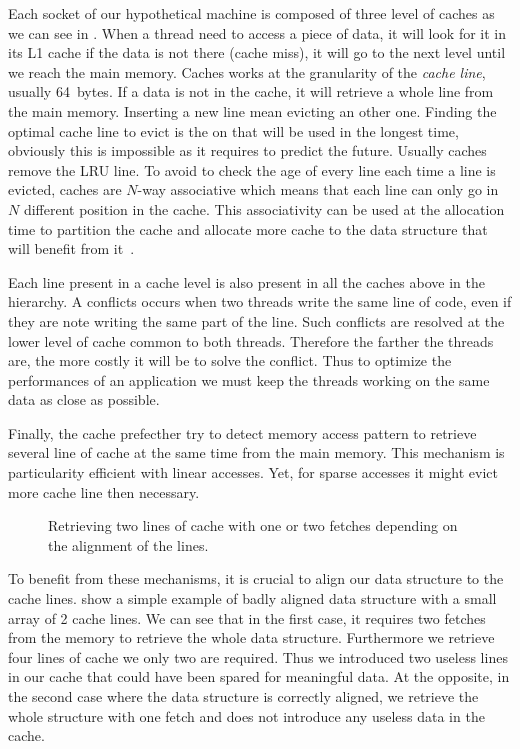 Each socket of our hypothetical machine is composed of three level of caches as we can see in .
When a thread need to access a piece of data, it will look for it in its L1 cache if the data is not there (cache miss), it will go to the next level until we reach the main memory.
Caches works at the granularity of the \emph{cache line}, usually \SI{64}{bytes}.
If a data is not in the cache, it will retrieve a whole line from the main memory.
Inserting a new line mean evicting an other one.
Finding the optimal cache line to evict is the on that will be used in the longest time, obviously this is impossible as it requires to predict the future.
Usually caches remove the \acrfull{LRU} line.
To avoid to check the age of every line each time a line is evicted, caches are $N$-way associative which means that each line can only go in $N$ different position in the cache.
This associativity can be used at the allocation time to partition the cache and allocate more cache to the data structure that will benefit from it~\cite{Perarnau11Controlling}.

Each line present in a cache level is also present in all the caches above in the hierarchy.
A conflicts occurs when two threads write the same line of code, even if they are note writing the same part of the line.
Such conflicts are resolved at the lower level of cache common to both threads.
Therefore the farther the threads are, the more costly it will be to solve the conflict.
Thus to optimize the performances of an application we must keep the threads working on the same data as close as possible.

Finally, the cache prefecther try to detect memory access pattern to retrieve several line of cache at the same time from the main memory.
This mechanism is particularity efficient with linear accesses.
Yet, for sparse accesses it might evict more cache line then necessary.

\begin{figure}[htb]
    \centering
    
    \caption[Example of Bad alignment]{Retrieving two lines of cache with one or two fetches depending on the alignment of the lines.}
    \label{fig:bad-align}
\end{figure}

To benefit from these mechanisms, it is crucial to align our data structure to the cache lines.
 show a simple example of badly aligned data structure with a small array of 2 cache lines.
We can see that in the first case, it requires two fetches from the memory to retrieve the whole data structure.
Furthermore we retrieve four lines of cache we only two are required.
Thus we introduced two useless lines in our cache that could have been spared for meaningful data.
At the opposite, in the second case where the data structure is correctly aligned, we retrieve the whole structure with one fetch and does not introduce any useless data in the cache.

